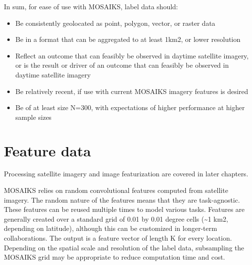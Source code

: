 \documentclass[
  letterpaper,
  DIV=11,
  numbers=noendperiod]{scrreprt}
\providecommand{\tightlist}{%
  \setlength{\itemsep}{0pt}\setlength{\parskip}{0pt}}\usepackage{longtable,booktabs,array}
\begin{document}
In sum, for ease of use with MOSAIKS, label data should:

\begin{itemize}
\tightlist
\item
  Be consistently geolocated as point, polygon, vector, or raster data\\
\item
  Be in a format that can be aggregated to at least 1km2, or lower
  resolution\\
\item
  Reflect an outcome that can feasibly be observed in daytime satellite
  imagery, or is the result or driver of an outcome that can feasibly be
  observed in daytime satellite imagery\\
\item
  Be relatively recent, if use with current MOSAIKS imagery features is
  desired\\
\item
  Be of at least size N=300, with expectations of higher performance at
  higher sample sizes
\end{itemize}

\hypertarget{feature-data}{%
\section*{Feature data}\label{feature-data}}


\begin{tcolorbox}[enhanced jigsaw, opacityback=0, left=2mm, leftrule=.75mm, colback=white, opacitybacktitle=0.6, colbacktitle=quarto-callout-note-color!10!white, toprule=.15mm, arc=.35mm, toptitle=1mm, colframe=quarto-callout-note-color-frame, bottomrule=.15mm, coltitle=black, bottomtitle=1mm, rightrule=.15mm, titlerule=0mm, title=\textcolor{quarto-callout-note-color}{\faInfo}\hspace{0.5em}{Note}, breakable]

Processing satellite imagery and image featurization are covered in
later chapters.

\end{tcolorbox}

MOSAIKS relies on random convolutional features computed from satellite
imagery. The random nature of the features means that they are
task-agnostic. These features can be reused multiple times to model
various tasks. Features are generally created over a standard grid of
0.01 by 0.01 degree cells (\textasciitilde1 km2, depending on latitude),
although this can be customized in longer-term collaborations. The
output is a feature vector of length K for every location. Depending on
the spatial scale and resolution of the label data, subsampling the
MOSAIKS grid may be appropriate to reduce computation time and cost.
\end{document}
